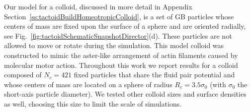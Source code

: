 \documentclass[%
 aip,
 amsmath,amssymb,
 reprint,%
]{revtex4-1}
\begin{document}
Our model for a colloid, discussed in more detail in Appendix Section~\ref{ss:tactoidBuildHomeotropicColloid}, is a set of GB particles whose centers of mass are fixed upon the surface of a sphere and are oriented radially, see Fig.~\ref{fig:tactoidSchematicSnapshotDirector}(d). These particles are not allowed to move or rotate during the simulation. This model colloid was constructed to mimic the aster-like arrangement of actin filaments caused by molecular motor action. Throughout this work we report results for a colloid composed of $N_c=421$ fixed particles that share the fluid pair potential and whose centers of mass are located on a sphere of radius $R_c=3.5\sigma_0$ (with $\sigma_0$ the short-axis particle diameter). We tested other colloid sizes and surface densities as well, choosing this size to limit the scale of simulations.
\end{document}
